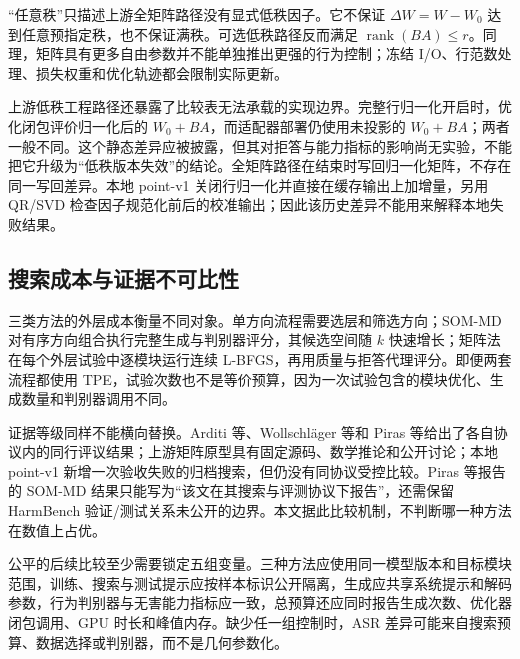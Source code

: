 

“任意秩”只描述上游全矩阵路径没有显式低秩因子。它不保证 $\Delta W=W-W_0$ 达到任意预指定秩，也不保证满秩。可选低秩路径反而满足 $\operatorname{rank}(BA)\leq r$。同理，矩阵具有更多自由参数并不能单独推出更强的行为控制；冻结 I/O、行范数处理、损失权重和优化轨迹都会限制实际更新。

上游低秩工程路径还暴露了比较表无法承载的实现边界。完整行归一化开启时，优化闭包评价归一化后的 $W_0+BA$，而适配器部署仍使用未投影的 $W_0+BA$；两者一般不同。这个静态差异应被披露，但其对拒答与能力指标的影响尚无实验，不能把它升级为“低秩版本失效”的结论。全矩阵路径在结束时写回归一化矩阵，不存在同一写回差异。本地 point-v1 关闭行归一化并直接在缓存输出上加增量，另用 QR/SVD 检查因子规范化前后的校准输出；因此该历史差异不能用来解释本地失败结果。

\subsection{搜索成本与证据不可比性}

三类方法的外层成本衡量不同对象。单方向流程需要选层和筛选方向；SOM-MD 对有序方向组合执行完整生成与判别器评分，其候选空间随 $k$ 快速增长；矩阵法在每个外层试验中逐模块运行连续 L-BFGS，再用质量与拒答代理评分。即便两套流程都使用 TPE，试验次数也不是等价预算，因为一次试验包含的模块优化、生成数量和判别器调用不同。

证据等级同样不能横向替换。Arditi 等、Wollschl\"ager 等和 Piras 等给出了各自协议内的同行评议结果\cite{arditi2024refusal,wollschlager2025geometry,piras2026som}；上游矩阵原型具有固定源码、数学推论和公开讨论；本地 point-v1 新增一次验收失败的归档搜索，但仍没有同协议受控比较。Piras 等报告的 SOM-MD 结果只能写为“该文在其搜索与评测协议下报告”，还需保留 HarmBench 验证/测试关系未公开的边界。本文据此比较机制，不判断哪一种方法在数值上占优。

公平的后续比较至少需要锁定五组变量。三种方法应使用同一模型版本和目标模块范围，训练、搜索与测试提示应按样本标识公开隔离，生成应共享系统提示和解码参数，行为判别器与无害能力指标应一致，总预算还应同时报告生成次数、优化器闭包调用、GPU 时长和峰值内存。缺少任一组控制时，ASR 差异可能来自搜索预算、数据选择或判别器，而不是几何参数化。
